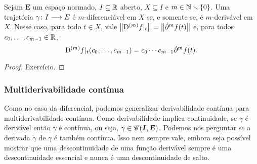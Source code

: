 \begin{proposition}
\label{prop:multidiferenciabilidade.multiderivabilidade}
Sejam $\bm E$ um espaço normado, $I \subseteq \mathbb{R}$ aberto, $X \subseteq I$ e $m \in \mathbb{N} \smallsetminus \{0\}$. Uma trajetória $\gamma\colon \allowbreak I \longrightarrow E$ é $m$-diferenciável em $X$ se, e somente se, é $m$-derivável em $X$. Nesse caso, para todo $t \in X$, vale $\left\Vert{\mathrm{D}^{(m)} f|_t}\right\Vert = \left\Vert{\dot{\partial}^m f(t)}\right\Vert$ e, para todos $c_0, \ldots, c_{m-1} \in \mathbb{R}$,
	\begin{equation*}
	\mathrm{D}^{(m)} f|_t(c_0, \ldots, c_{m-1}) = c_0 \cdots c_{m-1} \dot{\partial}^m f(t).
	\end{equation*}
\end{proposition}
\begin{proof}
Exercício.
\end{proof}

\subsubsection{Multiderivabilidade contínua}

Como no caso da diferencial, podemos generalizar derivabilidade contínua para multiderivabilidade contínua. Como derivabilidade implica continuidade, se $\gamma$ é derivável então $\gamma$ é contínua, ou seja, $\gamma \in \mathscr{C}(\bm I,\bm E)$. Podemos nos perguntar se a derivada $\dot{\gamma}$ de $\gamma$ é também contínua. Isso nem sempre vale, embora seja possível mostrar que uma descontinuidade de uma função derivável sempre é uma descontinuidade essencial e nunca é uma descontinuidade de salto.

\begin{comment}

\begin{definition}[Multiderivabilidade]
Sejam $\bm E$ um espaço normado e $I \subseteq \R$ um intervalo aberto. Para todo $k \in \N$, definimos indutivamente:
	\begin{enumerate}
	\item Uma trajetória $\Cont^0$-\emph{derivável} de $I$ para $E$ é uma trajetória contínua $\fun{\gamma}{I}{E}$ e sua $0$-ésima derivada é $\der^0 \gamma := \gamma$. O conjunto dessas trajetórias é denotado $\Cont^0(\bm I,\bm E) := \Cont(\bm I,\bm E)$.
	\item Uma trajetória $\Cont^k$-\emph{derivável} de $I$ para $E$ é uma trajetória derivável $\fun{\gamma}{I}{E}$ tal que $\fun{\der \gamma}{I}{E}$ é $\Cont^{k-1}$-derivável. Sua $k$-ésima derivada é
		\begin{equation*}
		\der^k \gamma := \der^{k-1} (\der \gamma).
		\end{equation*}
	O conjunto dessas trajetórias é denotado $\Cont^k(\bm I,\bm E)$.
	\item Uma trajetória $\Cont^\infty$-\emph{derivável} (ou \emph{suave}) de $I$ para $E$ é uma trajetória $\fun{\gamma}{I}{E}$ tal que, para todo $k \in \N$, $\gamma$ é $\Cont^{k}$-derivável. O conjunto dessas trajetórias é denotado $\Cont^\infty(\bm I,\bm E)$.
	\end{enumerate}
\end{definition}

\end{comment}

